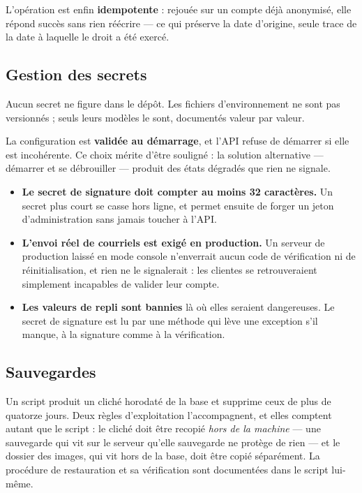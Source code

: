 L'opération est enfin \textbf{idempotente} : rejouée sur un compte déjà
anonymisé, elle répond succès sans rien réécrire --- ce qui préserve la date
d'origine, seule trace de la date à laquelle le droit a été exercé.

\subsection{Gestion des secrets}

Aucun secret ne figure dans le dépôt. Les fichiers d'environnement ne sont pas
versionnés ; seuls leurs modèles le sont, documentés valeur par valeur.

La configuration est \textbf{validée au démarrage}, et l'API refuse de démarrer
si elle est incohérente. Ce choix mérite d'être souligné : la solution
alternative --- démarrer et se débrouiller --- produit des états dégradés que
rien ne signale.

\begin{itemize}[leftmargin=1.2cm]
  \item \textbf{Le secret de signature doit compter au moins 32 caractères.} Un
  secret plus court se casse hors ligne, et permet ensuite de forger un jeton
  d'administration sans jamais toucher à l'API.

  \item \textbf{L'envoi réel de courriels est exigé en production.} Un serveur
  de production laissé en mode console n'enverrait aucun code de vérification
  ni de réinitialisation, et rien ne le signalerait : les clientes se
  retrouveraient simplement incapables de valider leur compte.

  \item \textbf{Les valeurs de repli sont bannies} là où elles seraient
  dangereuses. Le secret de signature est lu par une méthode qui lève une
  exception s'il manque, à la signature comme à la vérification.
\end{itemize}

\subsection{Sauvegardes}

Un script produit un cliché horodaté de la base et supprime ceux de plus de
quatorze jours. Deux règles d'exploitation l'accompagnent, et elles comptent
autant que le script : le cliché doit être recopié \emph{hors de la machine}
--- une sauvegarde qui vit sur le serveur qu'elle sauvegarde ne protège de rien
--- et le dossier des images, qui vit hors de la base, doit être copié
séparément. La procédure de restauration et sa vérification sont documentées
dans le script lui-même.

